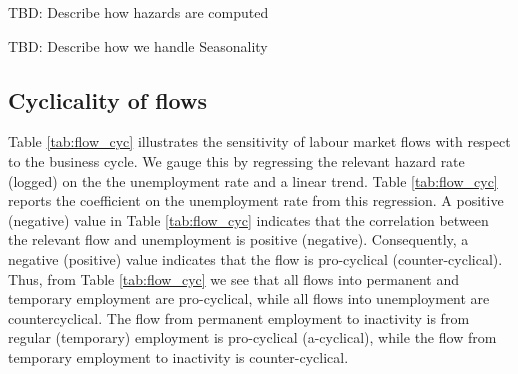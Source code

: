 TBD: Describe how hazards are computed

TBD: Describe how we handle Seasonality

\subsection{Cyclicality of flows}

Table \ref{tab:flow_cyc} illustrates the sensitivity of labour market flows with respect to the business cycle. We gauge this by regressing the relevant hazard rate (logged) on the the unemployment rate and a linear trend. Table \ref{tab:flow_cyc} reports the coefficient on the unemployment rate from this regression. A positive (negative) value in Table \ref{tab:flow_cyc} indicates that the correlation between the relevant flow and unemployment is positive (negative). Consequently, a negative (positive) value indicates that the flow is pro-cyclical (counter-cyclical). Thus, from Table \ref{tab:flow_cyc} we see that all flows into permanent and temporary employment are pro-cyclical, while all flows into unemployment are countercyclical. The flow from permanent employment to inactivity is from regular (temporary) employment is pro-cyclical (a-cyclical), while the flow from temporary employment to inactivity is counter-cyclical. 

